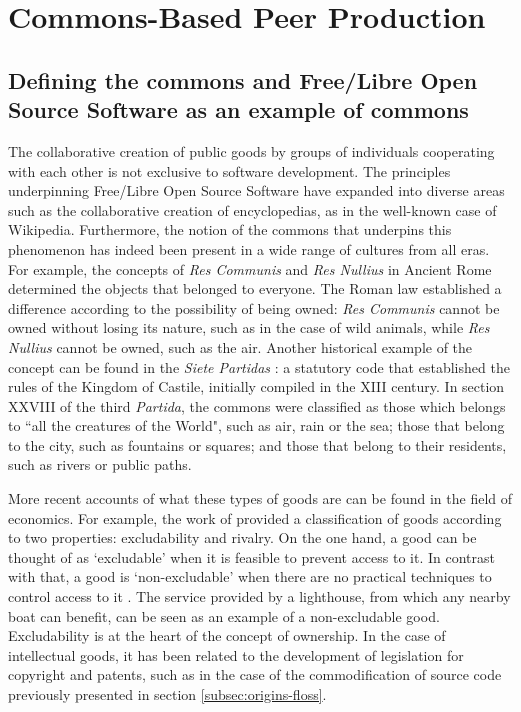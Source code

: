 \section{Commons-Based Peer Production}
\label{subsec:state-art:cbpp}

\subsection{Defining the commons and Free/Libre Open Source Software as an example of commons}
\label{subsubsec:state-art:cbpp:commons}

The collaborative creation of public goods by groups of individuals cooperating with each other is not exclusive to software development. The principles underpinning Free/Libre Open Source Software have expanded into diverse areas such as the collaborative creation of encyclopedias, as in the well-known case of Wikipedia. Furthermore, the notion of the commons that underpins this phenomenon has indeed been present in a wide range of cultures from all eras. For example, the concepts of \textit{Res Communis} and \textit{Res Nullius} \parencite[19-20]{gevaber1776} in Ancient Rome determined the objects that belonged to everyone. The Roman law established a difference according to the possibility of being owned: \textit{Res Communis} cannot be owned without losing its nature, such as in the case of wild animals, while \textit{Res Nullius} cannot be owned, such as the air. Another historical example of the concept can be found in the \textit{Siete Partidas} \parencite{alfonso1972siete}: a statutory code that established the rules of the Kingdom of Castile, initially compiled in the XIII century. In section XXVIII of the third \textit{Partida}, the commons were classified as those which belongs to ``all the creatures of the World", such as air, rain or the sea; those that belong to the city, such as fountains or squares; and those that belong to their residents, such as rivers or public paths.

More recent accounts of what these types of goods are can be found in the field of economics. For example, the work of  \textcite{ostrom1999public} provided a classification of goods according to two properties: excludability and rivalry. On the one hand, a good can be thought of as `excludable' when it is feasible to prevent access to it. In contrast with that, a good is `non-excludable' when there are no practical techniques to control access to it \parencite{ostrom1999public}. The service provided by a lighthouse, from which any nearby boat can benefit, can be seen as an example of a non-excludable good. Excludability is at the heart of the concept of ownership. In the case of intellectual goods, it has been related to the development of legislation for copyright and patents, such as in the case of the commodification of source code previously presented in section \ref{subsec:origins-floss}.

